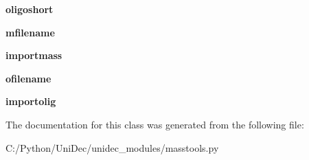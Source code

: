 \begin{DoxyCompactItemize}
\item 
\hypertarget{class_uni_dec_1_1unidec__modules_1_1masstools_1_1_mass_selection_a4c53871059dae2e132d4f9038c6d459c}{}{\bfseries oligoshort}\label{class_uni_dec_1_1unidec__modules_1_1masstools_1_1_mass_selection_a4c53871059dae2e132d4f9038c6d459c}

\item 
\hypertarget{class_uni_dec_1_1unidec__modules_1_1masstools_1_1_mass_selection_a5b96be74c068f5e52528b7112fc3edd8}{}{\bfseries mfilename}\label{class_uni_dec_1_1unidec__modules_1_1masstools_1_1_mass_selection_a5b96be74c068f5e52528b7112fc3edd8}

\item 
\hypertarget{class_uni_dec_1_1unidec__modules_1_1masstools_1_1_mass_selection_aa30d2f769f87eb380802b32ba2bc14db}{}{\bfseries importmass}\label{class_uni_dec_1_1unidec__modules_1_1masstools_1_1_mass_selection_aa30d2f769f87eb380802b32ba2bc14db}

\item 
\hypertarget{class_uni_dec_1_1unidec__modules_1_1masstools_1_1_mass_selection_aadad9096a04633ce1371d362d58baf20}{}{\bfseries ofilename}\label{class_uni_dec_1_1unidec__modules_1_1masstools_1_1_mass_selection_aadad9096a04633ce1371d362d58baf20}

\item 
\hypertarget{class_uni_dec_1_1unidec__modules_1_1masstools_1_1_mass_selection_a5137c9cf7e3e14606b233c2c162ca97b}{}{\bfseries importolig}\label{class_uni_dec_1_1unidec__modules_1_1masstools_1_1_mass_selection_a5137c9cf7e3e14606b233c2c162ca97b}

\end{DoxyCompactItemize}


The documentation for this class was generated from the following file\+:\begin{DoxyCompactItemize}
\item 
C\+:/\+Python/\+Uni\+Dec/unidec\+\_\+modules/masstools.\+py\end{DoxyCompactItemize}
